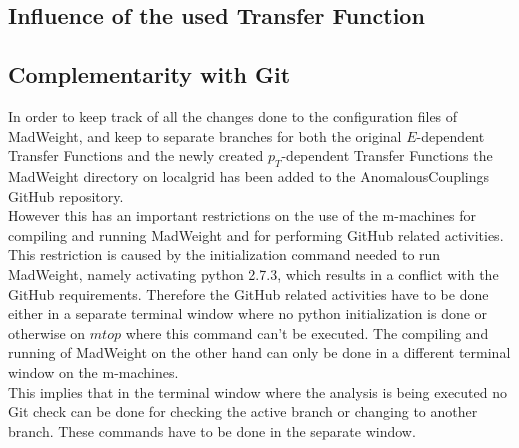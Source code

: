 \subsection{Influence of the used Transfer Function}

\subsection{Complementarity with Git}
In order to keep track of all the changes done to the configuration files of MadWeight, and keep to separate branches for both the original $E$-dependent Transfer Functions and the newly created $p_{T}$-dependent Transfer Functions the MadWeight directory on localgrid has been added to the AnomalousCouplings GitHub repository.\\
However this has an important restrictions on the use of the m-machines for compiling and running MadWeight and for performing GitHub related activities. This restriction is caused by the initialization command needed to run MadWeight, namely activating python 2.7.3, which results in a conflict with the GitHub requirements. Therefore the GitHub related activities have to be done either in a separate terminal window where no python initialization is done or otherwise on $mtop$ where this command can't be executed. The compiling and running of MadWeight on the other hand can only be done in a different terminal window on the m-machines.\\
This implies that in the terminal window where the analysis is being executed no Git check can be done for checking the active branch or changing to another branch. These commands have to be done in the separate window.

